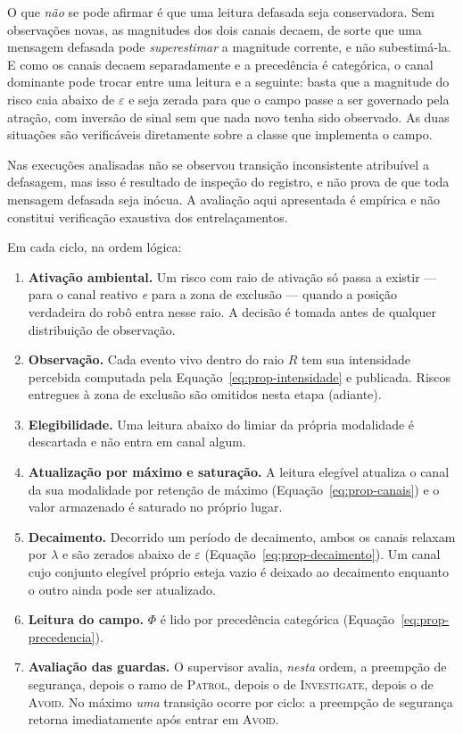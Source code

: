O que \emph{não} se pode afirmar é que uma leitura defasada seja conservadora. Sem
observações novas, as magnitudes dos dois canais decaem, de sorte que uma mensagem
defasada pode \emph{superestimar} a magnitude corrente, e não subestimá-la. E como os
canais decaem separadamente e a precedência é categórica, o canal dominante pode trocar
entre uma leitura e a seguinte: basta que a magnitude do risco caia abaixo de
$\varepsilon$ e seja zerada para que o campo passe a ser governado pela atração, com
inversão de sinal sem que nada novo tenha sido observado. As duas situações são
verificáveis diretamente sobre a classe que implementa o campo.

Nas execuções analisadas não se observou transição inconsistente atribuível a
defasagem, mas isso é resultado de inspeção do registro, e não prova de que toda
mensagem defasada seja inócua. A avaliação aqui apresentada é empírica e não constitui
verificação exaustiva dos entrelaçamentos.

Em cada ciclo, na ordem lógica:

\begin{enumerate}
    \item \textbf{Ativação ambiental.} Um risco com raio de ativação só passa a
    existir --- para o canal reativo \emph{e} para a zona de exclusão --- quando a
    posição verdadeira do robô entra nesse raio. A decisão é tomada antes de qualquer
    distribuição de observação.
    \item \textbf{Observação.} Cada evento vivo dentro do raio $R$ tem sua intensidade
    percebida computada pela Equação~\eqref{eq:prop-intensidade} e publicada. Riscos
    entregues à zona de exclusão são omitidos nesta etapa (adiante).
    \item \textbf{Elegibilidade.} Uma leitura abaixo do limiar da própria modalidade é
    descartada e não entra em canal algum.
    \item \textbf{Atualização por máximo e saturação.} A leitura elegível atualiza o
    canal da sua modalidade por retenção de máximo
    (Equação~\eqref{eq:prop-canais}) e o valor armazenado é saturado no próprio lugar.
    \item \textbf{Decaimento.} Decorrido um período de decaimento, ambos os canais
    relaxam por $\lambda$ e são zerados abaixo de $\varepsilon$
    (Equação~\eqref{eq:prop-decaimento}). Um canal cujo conjunto elegível próprio
    esteja vazio é deixado ao decaimento enquanto o outro ainda pode ser atualizado.
    \item \textbf{Leitura do campo.} $\Phi$ é lido por precedência categórica
    (Equação~\eqref{eq:prop-precedencia}).
    \item \textbf{Avaliação das guardas.} O supervisor avalia, \emph{nesta} ordem, a
    preempção de segurança, depois o ramo de \textsc{Patrol}, depois o de
    \textsc{Investigate}, depois o de \textsc{Avoid}. No máximo \emph{uma} transição
    ocorre por ciclo: a preempção de segurança retorna imediatamente após entrar em
    \textsc{Avoid}.
\end{enumerate}

